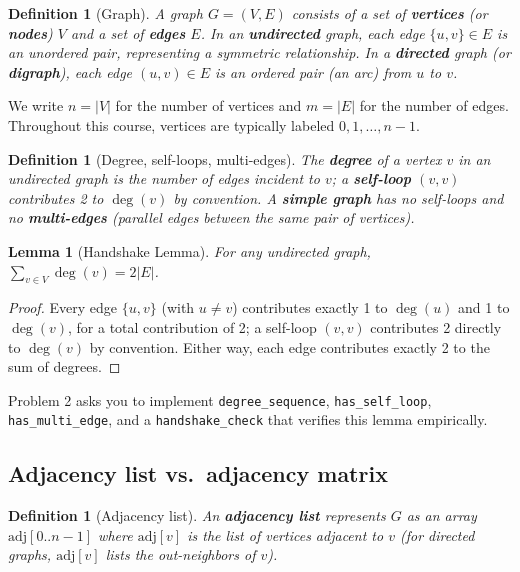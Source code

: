 \documentclass[11pt]{article}
\newtheorem{lemma}[theorem]{Lemma}
\newtheorem{definition}[theorem]{Definition}
\begin{document}
\begin{definition}[Graph]
A graph $G = (V, E)$ consists of a set of \textbf{vertices} (or \textbf{nodes}) $V$ and a
set of \textbf{edges} $E$. In an \textbf{undirected} graph, each edge $\{u,v\} \in E$ is an
unordered pair, representing a symmetric relationship. In a \textbf{directed} graph (or
\textbf{digraph}), each edge $(u,v) \in E$ is an ordered pair (an \emph{arc}) from $u$ to
$v$.
\end{definition}

We write $n = |V|$ for the number of vertices and $m = |E|$ for the number of edges.
Throughout this course, vertices are typically labeled $0, 1, \dots, n-1$.

\begin{definition}[Degree, self-loops, multi-edges]
The \textbf{degree} of a vertex $v$ in an undirected graph is the number of edges
incident to $v$; a \textbf{self-loop} $(v,v)$ contributes \emph{2} to $\deg(v)$ by
convention. A \textbf{simple graph} has no self-loops and no \textbf{multi-edges}
(parallel edges between the same pair of vertices).
\end{definition}

\begin{lemma}[Handshake Lemma]
For any undirected graph, $\sum_{v \in V} \deg(v) = 2|E|$.
\end{lemma}
\begin{proof}
Every edge $\{u,v\}$ (with $u \ne v$) contributes exactly 1 to $\deg(u)$ and 1 to
$\deg(v)$, for a total contribution of 2; a self-loop $(v,v)$ contributes 2 directly to
$\deg(v)$ by convention. Either way, each edge contributes exactly 2 to the sum of
degrees.
\end{proof}

Problem 2 asks you to implement \texttt{degree\_sequence}, \texttt{has\_self\_loop},
\texttt{has\_multi\_edge}, and a \texttt{handshake\_check} that verifies this lemma
empirically.

\subsection{Adjacency list vs.\ adjacency matrix}

\begin{definition}[Adjacency list]
An \textbf{adjacency list} represents $G$ as an array $\mathrm{adj}[0..n-1]$ where
$\mathrm{adj}[v]$ is the list of vertices adjacent to $v$ (for directed graphs,
$\mathrm{adj}[v]$ lists the \emph{out-neighbors} of $v$).
\end{definition}
\end{document}
